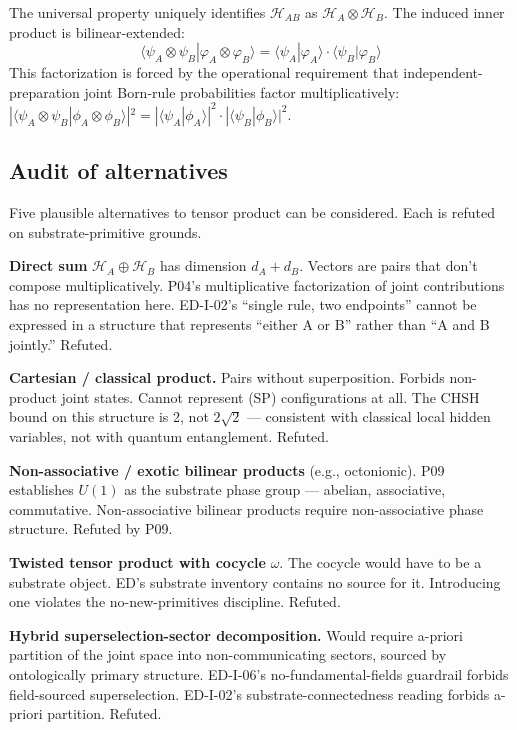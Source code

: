 \documentclass[11pt,a4paper]{article}
\begin{document}
The universal property uniquely identifies $\mathcal{H}_{AB}$ as $\mathcal{H}_A \otimes \mathcal{H}_B$. The induced inner product is bilinear-extended:
\[
\langle \psi_A \otimes \psi_B | \varphi_A \otimes \varphi_B\rangle = \langle \psi_A|\varphi_A\rangle \cdot \langle \psi_B|\varphi_B\rangle
\]
This factorization is forced by the operational requirement that independent-preparation joint Born-rule probabilities factor multiplicatively: $|\langle\psi_A \otimes \psi_B | \phi_A \otimes \phi_B\rangle|^2 = |\langle\psi_A|\phi_A\rangle|^2 \cdot |\langle\psi_B|\phi_B\rangle|^2$.

\subsection{Audit of alternatives}

Five plausible alternatives to tensor product can be considered. Each is refuted on substrate-primitive grounds.

\textbf{Direct sum} $\mathcal{H}_A \oplus \mathcal{H}_B$ has dimension $d_A + d_B$. Vectors are pairs that don't compose multiplicatively. P04's multiplicative factorization of joint contributions has no representation here. ED-I-02's ``single rule, two endpoints'' cannot be expressed in a structure that represents ``either A or B'' rather than ``A and B jointly.'' Refuted.

\textbf{Cartesian / classical product.} Pairs without superposition. Forbids non-product joint states. Cannot represent (SP) configurations at all. The CHSH bound on this structure is 2, not $2\sqrt{2}$ --- consistent with classical local hidden variables, not with quantum entanglement. Refuted.

\textbf{Non-associative / exotic bilinear products} (e.g., octonionic). P09 establishes $U(1)$ as the substrate phase group --- abelian, associative, commutative. Non-associative bilinear products require non-associative phase structure. Refuted by P09.

\textbf{Twisted tensor product with cocycle} $\omega$. The cocycle would have to be a substrate object. ED's substrate inventory contains no source for it. Introducing one violates the no-new-primitives discipline. Refuted.

\textbf{Hybrid superselection-sector decomposition.} Would require a-priori partition of the joint space into non-communicating sectors, sourced by ontologically primary structure. ED-I-06's no-fundamental-fields guardrail forbids field-sourced superselection. ED-I-02's substrate-connectedness reading forbids a-priori partition. Refuted.
\end{document}
